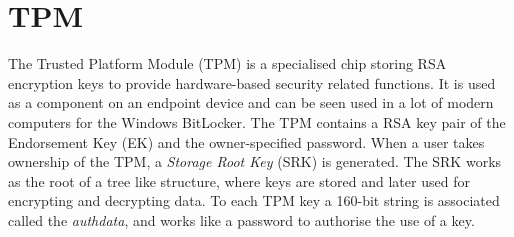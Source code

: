 \section{TPM} %
The Trusted Platform Module (TPM) is a specialised chip storing RSA encryption keys to provide hardware-based security related functions. It is used as a component on an endpoint device and can be seen used in a lot of modern computers for the Windows BitLocker.
The TPM contains a RSA key pair of the Endorsement Key (EK) and the owner-specified password. When a user takes ownership of the TPM, a \textit{Storage Root Key} (SRK) is generated. The SRK works as the root of a tree like structure, where keys are stored and later used for encrypting and decrypting data. To each TPM key a 160-bit string is associated called the \textit{authdata}, and works like a password to authorise the use of a key. \\

